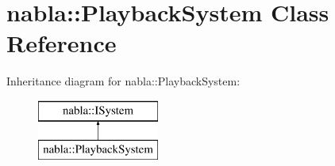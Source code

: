 \hypertarget{classnabla_1_1_playback_system}{}\section{nabla\+::Playback\+System Class Reference}
\label{classnabla_1_1_playback_system}
Inheritance diagram for nabla\+::Playback\+System\+:\begin{figure}[H]
\begin{center}
\leavevmode
\includegraphics[height=2.000000cm]{classnabla_1_1_playback_system}
\end{center}
\end{figure}
